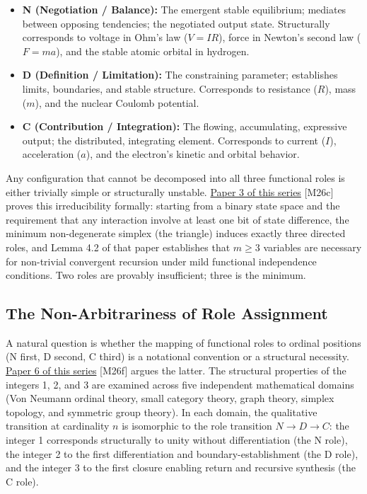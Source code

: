 \documentclass[12pt]{article}
\providecommand{\tightlist}{%
  \setlength{\itemsep}{0pt}\setlength{\parskip}{0pt}}
\begin{document}
\begin{itemize}
\tightlist
\item
  \textbf{N (Negotiation / Balance):} The emergent stable equilibrium;
  mediates between opposing tendencies; the negotiated output state.
  Structurally corresponds to voltage in Ohm's law (\(V = IR\)), force
  in Newton's second law (\(F = ma\)), and the stable atomic orbital in
  hydrogen.
\item
  \textbf{D (Definition / Limitation):} The constraining parameter;
  establishes limits, boundaries, and stable structure. Corresponds to
  resistance (\(R\)), mass (\(m\)), and the nuclear Coulomb potential.
\item
  \textbf{C (Contribution / Integration):} The flowing, accumulating,
  expressive output; the distributed, integrating element. Corresponds
  to current (\(I\)), acceleration (\(a\)), and the electron's kinetic
  and orbital behavior.
\end{itemize}

Any configuration that cannot be decomposed into all three functional
roles is either trivially simple or structurally unstable.
\href{https://github.com/baardev/truevalue/blob/main/docnav/Research/papers/3_minimal-recursive-triadic-framework/3_minimal-recursive-triadic-framework.pdf}{Paper
3 of this series} {[}M26c{]} proves this irreducibility formally:
starting from a binary state space and the requirement that any
interaction involve at least one bit of state difference, the minimum
non-degenerate simplex (the triangle) induces exactly three directed
roles, and Lemma 4.2 of that paper establishes that \(m \ge 3\)
variables are necessary for non-trivial convergent recursion under mild
functional independence conditions. Two roles are provably insufficient;
three is the minimum.

\subsection{The Non-Arbitrariness of Role Assignment}\label{the-non-arbitrariness-of-role-assignment}

A natural question is whether the mapping of functional roles to ordinal
positions (N first, D second, C third) is a notational convention or a
structural necessity.
\href{https://github.com/baardev/truevalue/blob/main/docnav/Research/papers/6_qualitative-nature-integers-triadic-roles/6_qualitative-nature-integers-triadic-roles.pdf}{Paper
6 of this series} {[}M26f{]} argues the latter. The structural
properties of the integers 1, 2, and 3 are examined across five
independent mathematical domains (Von Neumann ordinal theory, small
category theory, graph theory, simplex topology, and symmetric group
theory). In each domain, the qualitative transition at cardinality \(n\)
is isomorphic to the role transition \(N \to D \to C\): the integer 1
corresponds structurally to unity without differentiation (the N role),
the integer 2 to the first differentiation and boundary-establishment
(the D role), and the integer 3 to the first closure enabling return and
recursive synthesis (the C role).
\end{document}
